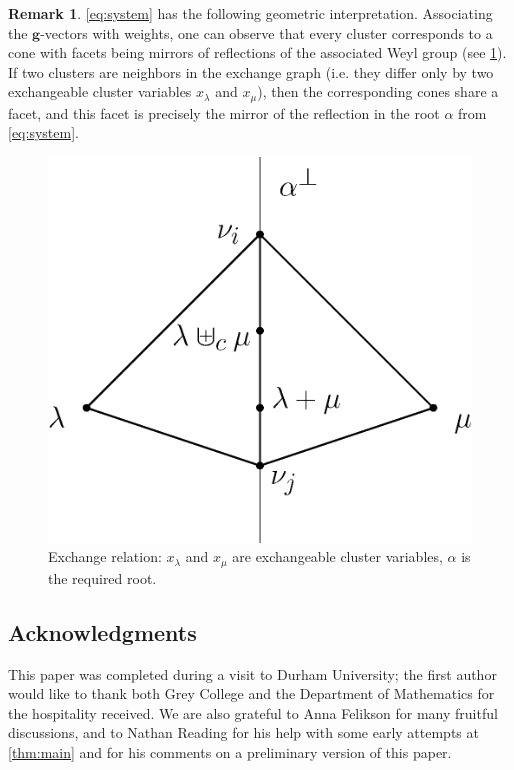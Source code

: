 \documentclass[11pt]{amsart}
\newcommand{\bg}{\mathbf{g}}
\theoremstyle{definition}
\newtheorem{remark}[theorem]{Remark}
\numberwithin{equation}{section}
\numberwithin{figure}{section}
\begin{document}
  \begin{remark}
    \label{geom}
    \cref{eq:system} has the following geometric interpretation.
    Associating the $\bg$-vectors with weights, one can observe that every cluster corresponds to a cone with facets being mirrors of reflections of the associated Weyl group (see \cref{fig:exchange_relation}).
    If two clusters are neighbors in the exchange graph (i.e. they differ only by two exchangeable cluster variables $x_\lambda$ and $x_\mu$), then the corresponding cones share a facet, and this facet is precisely the mirror of the reflection in the root $\alpha$ from \cref{eq:system}.
   \begin{figure}[h]
      \begin{center}
        \includegraphics[scale=0.4]{cones-section.eps}
      \end{center}
      \caption{Exchange relation: $x_\lambda$ and $x_\mu$ are exchangeable cluster variables, $\alpha$ is the required root.}
      \label{fig:exchange_relation}
    \end{figure}
\end{remark}

\subsection*{Acknowledgments}
  This paper was completed during a visit to Durham University; the first author would like to thank both Grey College and the Department of Mathematics for the hospitality received.
  We are also grateful to Anna Felikson for many fruitful discussions, and to Nathan Reading for his help with some early attempts at \cref{thm:main} and for his comments on a preliminary version of this paper.
\end{document}
